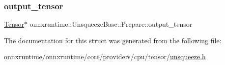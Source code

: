 \mbox{\label{structonnxruntime_1_1UnsqueezeBase_1_1Prepare_a648878e7044ce11f920bd1b6bef63f54}} 
\subsubsection{\texorpdfstring{output\+\_\+tensor}{output\_tensor}}
{\footnotesize\ttfamily \mbox{\hyperlink{classonnxruntime_1_1Tensor}{Tensor}}$\ast$ onnxruntime\+::\+Unsqueeze\+Base\+::\+Prepare\+::output\+\_\+tensor}



The documentation for this struct was generated from the following file\+:\begin{DoxyCompactItemize}
\item 
onnxruntime/onnxruntime/core/providers/cpu/tensor/\mbox{\hyperlink{cpu_2tensor_2unsqueeze_8h}{unsqueeze.\+h}}\end{DoxyCompactItemize}
